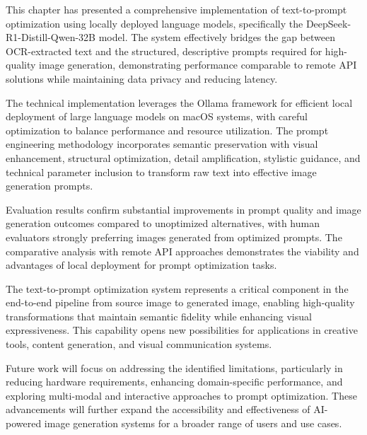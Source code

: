 This chapter has presented a comprehensive implementation of text-to-prompt optimization using locally deployed language models, specifically the DeepSeek-R1-Distill-Qwen-32B model. The system effectively bridges the gap between OCR-extracted text and the structured, descriptive prompts required for high-quality image generation, demonstrating performance comparable to remote API solutions while maintaining data privacy and reducing latency.

The technical implementation leverages the Ollama framework for efficient local deployment of large language models on macOS systems, with careful optimization to balance performance and resource utilization. The prompt engineering methodology incorporates semantic preservation with visual enhancement, structural optimization, detail amplification, stylistic guidance, and technical parameter inclusion to transform raw text into effective image generation prompts.

Evaluation results confirm substantial improvements in prompt quality and image generation outcomes compared to unoptimized alternatives, with human evaluators strongly preferring images generated from optimized prompts. The comparative analysis with remote API approaches demonstrates the viability and advantages of local deployment for prompt optimization tasks.

The text-to-prompt optimization system represents a critical component in the end-to-end pipeline from source image to generated image, enabling high-quality transformations that maintain semantic fidelity while enhancing visual expressiveness. This capability opens new possibilities for applications in creative tools, content generation, and visual communication systems.

Future work will focus on addressing the identified limitations, particularly in reducing hardware requirements, enhancing domain-specific performance, and exploring multi-modal and interactive approaches to prompt optimization. These advancements will further expand the accessibility and effectiveness of AI-powered image generation systems for a broader range of users and use cases.